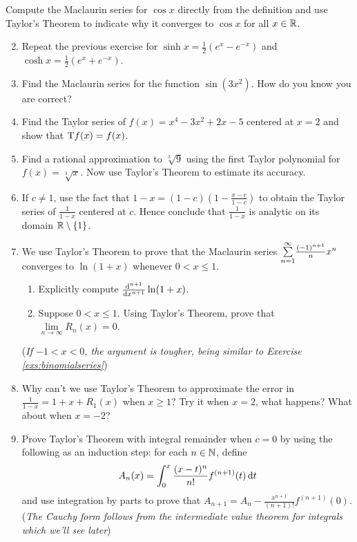 \begin{exercises}
\exstart Compute the Maclaurin series for $\cos x$ directly from the definition and use Taylor's Theorem to indicate why it converges to $\cos x$ for all $x\in \R$.
\begin{enumerate}\setcounter{enumi}{1}
  \item Repeat the previous exercise for $\sinh x=\frac 12(e^x-e^{-x})$ and $\cosh x=\frac 12(e^x+e^{-x})$.
  
  \item Find the Maclaurin series for the function $\sin(3x^2)$. How do you know you are correct?
  
  \item Find the Taylor series of $f(x)=x^4-3x^2+2x-5$ centered at $x=2$ and show that $\rT f(x)=f(x)$.
  
  \item Find a rational approximation to $\sqrt[3]{9}$ using the first Taylor polynomial for $f(x)=\sqrt[3]{x}$. Now use Taylor's Theorem to estimate its accuracy.
  
  \item If $c\neq 1$, use the fact that $1-x=(1-c)\left(1-\frac{x-c}{1-c}\right)$ to obtain the Taylor series of $\frac 1{1-x}$ centered at $c$. Hence conclude that $\frac 1{1-x}$ is analytic on its domain $\R\setminus\{1\}$.
  
 	\item We use Taylor's Theorem to prove that the Maclaurin series $\smash[b]{\sum\limits_{n=1}^\infty} \frac{(-1)^{n+1}}nx^n$ converges to $\ln(1+x)$ whenever $0<x\le 1$.
 	\begin{enumerate}
 	  \item Explicitly compute $\diff[^{n+1}]{x^{n+1}}\ln(1+x)$. 
 	  \item Suppose $0<x\le 1$. Using Taylor's Theorem, prove that $\lim\limits_{n\to\infty}R_n(x)=0$.
	\end{enumerate}
	(\emph{If $-1<x<0$, the argument is tougher, being similar to Exercise \ref{exs:binomialseries}})
	
	\item Why can't we use Taylor's Theorem to approximate the error in $\frac 1{1-x}=1+x+R_1(x)$ when $x\ge 1$? Try it when $x=2$, what happens? What about when $x=-2$?
 	
	\item Prove Taylor's Theorem with integral remainder when $c=0$ by using the following as an induction step: for each $n\in\N$, define
 	\[A_n(x)=\int_0^x\frac{(x-t)^n}{n!}f^{(n+1)}(t)\,\dt\]
 	and use integration by parts to prove that $A_{n+1}=A_n-\frac{x^{n+1}}{(n+1)!}f^{(n+1)}(0)$.\smallbreak
 	(\emph{The Cauchy form follows from the intermediate value theorem for integrals which we'll see later})
 	

\end{enumerate}
\end{exercises}
